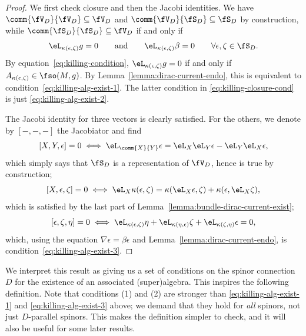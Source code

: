 \begin{proof}
	We first check closure and then the Jacobi identities. We have $\comm{\fV_D}{\fV_D}\subseteq\fV_D$ and $\comm{\fV_D}{\fS_D}\subseteq \fS_D$ by construction, while $\comm{\fS_D}{\fS_D}\subseteq\fV_D$ if and only if
	\begin{equation}\label{eq:killing-closure-cond}
		\eL_{\kappa(\epsilon,\zeta)}g = 0
		\qquad\text{and}\qquad
		\eL_{\kappa(\epsilon,\zeta)}\beta = 0 \qquad \forall\epsilon,\zeta\in\fS_D.
	\end{equation}
	By equation~\eqref{eq:killing-condition}, $\eL_{\kappa(\epsilon,\zeta)}g = 0$ if and only if $A_{\kappa(\epsilon,\zeta)}\in\fso(M,g)$. By Lemma~\ref{lemma:dirac-current-endo}, this is equivalent to condition~\eqref{eq:killing-alg-exist-1}. The latter condition in \eqref{eq:killing-closure-cond} is just \eqref{eq:killing-alg-exist-2}.
	
	The Jacobi identity for three vectors is clearly satisfied. For the others, we denote by $[-,-,-]$ the Jacobiator and find
	\[
		[X,Y,\epsilon]= 0 \iff \eL_{\comm{X}{Y}} \epsilon = \eL_X \eL_Y \epsilon - \eL_Y \eL_X \epsilon,
	\]
	which simply says that $\fS_D$ is a representation of $\fV_D$, hence is true by construction;
	\[
		[X,\epsilon,\zeta]= 0 \iff \eL_X \kappa(\epsilon,\zeta) = \kappa(\eL_X\epsilon,\zeta) + \kappa(\epsilon,\eL_X\zeta),
	\]
	which is satisfied by the last part of Lemma~\ref{lemma:bundle-dirac-current-exist};
	\[
		[\epsilon,\zeta,\eta] = 0 \iff \eL_{\kappa(\epsilon,\zeta)} \eta + \eL_{\kappa(\eta,\epsilon)} \zeta + \eL_{\kappa(\zeta,\eta)} \epsilon = 0,
	\]
	which, using the equation $\nabla \epsilon=\beta\epsilon$ and Lemma~\ref{lemma:dirac-current-endo}, is condition~\eqref{eq:killing-alg-exist-3}.
\end{proof}

We interpret this result as giving us a set of conditions on the spinor connection $D$ for the existence of an associated (super)algebra. This inspires the following definition. Note that conditions (1) and (2) are stronger than \eqref{eq:killing-alg-exist-1} and \eqref{eq:killing-alg-exist-3} above; we demand that they hold for \emph{all} spinors, not just $D$-parallel spinors. This makes the definition simpler to check, and it will also be useful for some later results.

